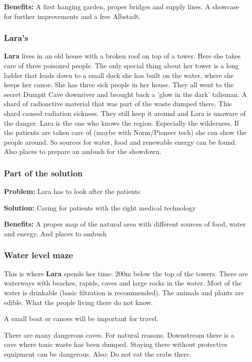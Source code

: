 \textbf{Benefits:} A first hanging garden, proper bridges and supply lines. A showcase for further improvements and a free Albstadt.

\subsubsection{Lara's}

\textbf{Lara} lives in an old house with a broken roof on top of a tower. Here she takes care of three poisoned people. The only special thing about her tower is a long ladder that leads down to a small dock she has built on the water, where she keeps her canoe.
She has three sick people in her house. They all went to the secret Dumpit Cave downriver and brought back a 'glow in the dark' talisman. A shard of radioactive material that was part of the waste dumped there. This shard caused radiation sickness. They still keep it around and Lara is unaware of the danger.
Lara is the one who knows the region. Especially the wilderness. If the patients are taken care of (maybe with Norm/Pioneer tech) she can show the people around. So sources for water, food and renewable energy can be found. Also places to prepare an ambush for the showdown.

\subsubsection{Part of the solution}

\textbf{Problem:} Lara has to look after the patients

\textbf{Solution:} Caring for patients with the right medical technology

\textbf{Benefits:} A proper map of the natural area with different sources of food, water and energy. And places to ambush

\subsubsection{Water level maze}

This is where \textbf{Lara} spends her time: 200m below the top of the towers. There are waterways with beaches, rapids, caves and large rocks in the water. Most of the water is drinkable (basic filtration is recommended). The animals and plants are edible. What the people living there do not know.

A small boat or canoes will be important for travel.

There are many dangerous caves. For natural reasons. Downstream there is a cave where toxic waste has been dumped. Staying there without protective equipment can be dangerous. Also: Do not eat the crabs there.

